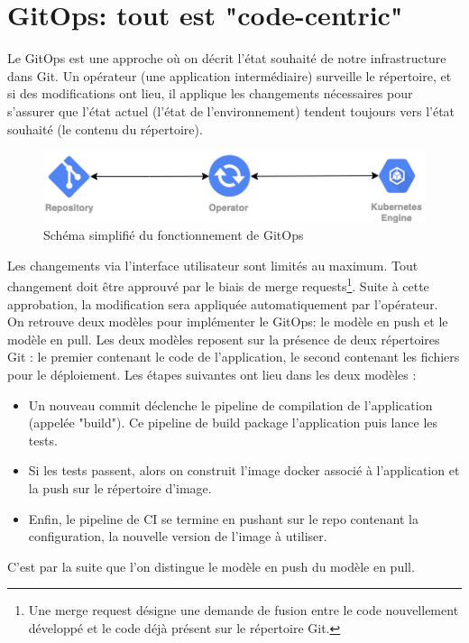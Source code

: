 \documentclass[11pt,fleqn]{book} %
\begin{document}
\section{GitOps: tout est "code-centric"}
Le GitOps est une approche où on décrit l’état souhaité de notre infrastructure dans Git. Un opérateur (une application intermédiaire) surveille le répertoire, et si des modifications ont lieu, il applique les changements nécessaires pour s’assurer que l'état actuel (l’état de l’environnement) tendent toujours vers l’état souhaité (le contenu du répertoire). 

\begin{figure}[H]\centering
\renewcommand{\figurename}{Schéma}
\includegraphics[scale=0.8]{Pictures/CI-CD/gitops-Intro.png}
\captionsetup{margin=1.5cm,format=hang,justification=justified}
\caption[]{Schéma simplifié du fonctionnement de GitOps \newline}
\end{figure}

Les changements via l’interface utilisateur sont limités au maximum. Tout changement doit être approuvé par le biais de merge requests\footnote{Une merge request désigne une demande de fusion entre le code nouvellement développé et le code déjà présent sur le répertoire Git.}. Suite à cette approbation, la modification sera appliquée automatiquement par l’opérateur.\\

On retrouve deux modèles pour implémenter le GitOps: le modèle en push et le modèle en pull. Les deux modèles reposent sur la présence de deux répertoires Git : le premier contenant le code de l'application, le second contenant les fichiers pour le déploiement. Les étapes suivantes ont lieu dans les deux modèles : 
\begin{itemize}
     \item Un nouveau commit déclenche le pipeline de compilation de l'application (appelée "build"). Ce pipeline de build package l'application puis lance les tests.
    \item Si les tests passent, alors on construit l'image docker associé à l'application et la push sur le répertoire d'image.
    \item Enfin, le pipeline de CI se termine en pushant sur le repo contenant la configuration, la nouvelle version de l'image à utiliser.
\end{itemize}
C'est par la suite que l'on distingue le modèle en push du modèle en pull.
\end{document}
